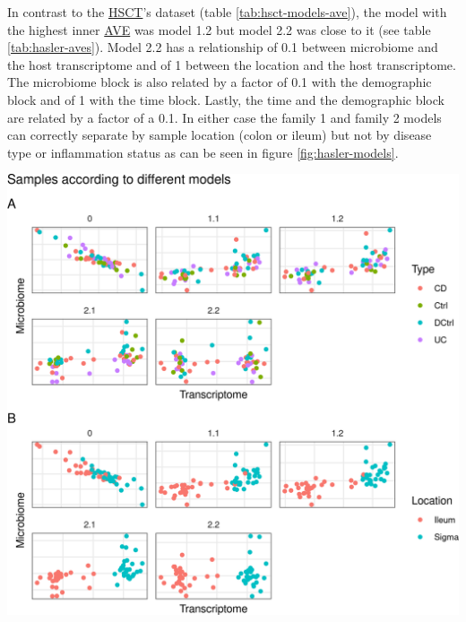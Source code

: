 \documentclass[
  12pt,
  a4paper,
  twoside,
  openright]{book}
\let\origfigure\figure
\let\endorigfigure\endfigure
\renewenvironment{figure}[1][2] {
    \expandafter\origfigure\expandafter[!htbp]
} {
    \endorigfigure
}
\begin{document}
In contrast to the \protect\hyperlink{acronyms_HSCT}{HSCT}'s dataset (table \ref{tab:hsct-models-ave}), the model with the highest inner \protect\hyperlink{acronyms_AVE}{AVE} was model 1.2 but model 2.2 was close to it (see table \ref{tab:hasler-aves}).
Model 2.2 has a relationship of 0.1 between microbiome and the host transcriptome and of 1 between the location and the host transcriptome.
The microbiome block is also related by a factor of 0.1 with the demographic block and of 1 with the time block.
Lastly, the time and the demographic block are related by a factor of a 0.1.
In either case the family 1 and family 2 models can correctly separate by sample location (colon or ileum) but not by disease type or inflammation status as can be seen in figure \ref{fig:hasler-models}.

\begin{figure}
\includegraphics[width=1\linewidth]{images/hasler-models} \caption[Models from inteRmodel in the Häsler's datset.]{Models from inteRmodel in the Häsler's dataset. Model 0 with just the transcriptome and microbiome data. Models 1.1 to 1.2 with transcriptome, microbiome and sample data in a single block. Models 2.1 and 2.2 with transcriptome, microbiome and sample data in multiple blocks. On the A panel colored by disease on the B panel colored by location of the sample.}\label{fig:hasler-models}
\end{figure}
\end{document}
